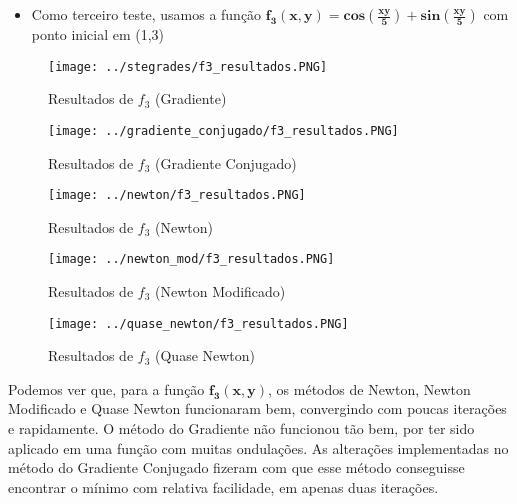 \begin{itemize}
	\item Como terceiro teste, usamos a função $ \mathbf{f_3(x,y) = cos(\frac{xy}{5})+sin(\frac{xy}{5})} $ com ponto inicial em (1,3)
\end{itemize}


\begin{figure}[H]
	\centering
	\begin{minipage}{.5\textwidth}
		\centering
		\texttt{[image: ../stegrades/f3\_resultados.PNG]}
		\caption{Resultados de $ f_3 $ (Gradiente)}
		\label{fig:resultados_grad_f3}
	\end{minipage}%
	\begin{minipage}{.5\textwidth}
		\centering
		\texttt{[image: ../gradiente\_conjugado/f3\_resultados.PNG]}
		\caption{Resultados de $ f_3 $ (Gradiente Conjugado)}
		\label{fig:resultados_grad_conj_f3}
	\end{minipage}
\end{figure}

\begin{figure}[H]
	\centering
	\begin{minipage}{.5\textwidth}
		\centering
		\texttt{[image: ../newton/f3\_resultados.PNG]}
		\caption{Resultados de $ f_3 $ (Newton)}
		\label{fig:resultados_newton_f3}
	\end{minipage}%
	\begin{minipage}{.5\textwidth}
		\centering
		\texttt{[image: ../newton\_mod/f3\_resultados.PNG]}
		\caption{Resultados de $ f_3 $ (Newton Modificado)}
		\label{fig:resultados_newton_mod_f3}
	\end{minipage}
\end{figure}

\begin{figure}[H]
	\begin{center}
		\texttt{[image: ../quase\_newton/f3\_resultados.PNG]}   
		\caption{Resultados de $ f_3 $ (Quase Newton)}
		\label{fig:resultados_quase_newton_f3}
	\end{center}
\end{figure}

Podemos ver que, para a função $ \mathbf{f_3(x,y)} $, os métodos de Newton, Newton Modificado e Quase Newton funcionaram bem, convergindo com poucas iterações e rapidamente. O método do Gradiente não funcionou tão bem, por ter sido aplicado em uma função com muitas ondulações. As alterações implementadas no método do Gradiente Conjugado fizeram com que esse método conseguisse encontrar o mínimo com relativa facilidade, em apenas duas iterações.


